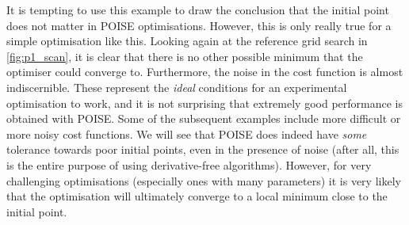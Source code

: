 It is tempting to use this example to draw the conclusion that the initial point does not matter in POISE optimisations.
However, this is only really true for a simple optimisation like this.
Looking again at the reference grid search in \cref{fig:p1_scan}, it is clear that there is no other possible minimum that the optimiser could converge to.
Furthermore, the noise in the cost function is almost indiscernible.
These represent the \textit{ideal} conditions for an experimental optimisation to work, and it is not surprising that extremely good performance is obtained with POISE.
Some of the subsequent examples include more difficult or more noisy cost functions.
We will see that POISE does indeed have \textit{some} tolerance towards poor initial points, even in the presence of noise (after all, this is the entire purpose of using derivative-free algorithms).
However, for very challenging optimisations (especially ones with many parameters) it is very likely that the optimisation will ultimately converge to a local minimum close to the initial point.
